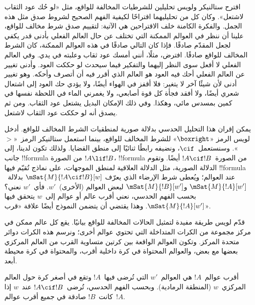 \documentclass[../../../include/open-logic-section]{subfiles}
\begin{document}


اقترح ستالنيكر ولويس تحليلين للشرطيات المخالفة للواقع، مثل «لو حُك
عود الثقاب لاشتعل». وكان كل من تحليليهما اقتراحًا لكيفية الفهم الصحيح
لشروط صدق مثل هذه الجمل. والفكرة الكامنة خلف الاقتراحين هي الآتية:
لتقييم صدق شرط مخالف للواقع، علينا أن ننظر في العوالم الممكنة التي تختلف
عن حال العالم الفعلي بأدنى قدر يكفي لجعل المقدّم صادقًا. فإذا كان التالي
صادقًا في هذه العوالم الممكنة، كان الشرط المخالف للواقع صادقًا. افترض،
مثلًا، أنني أمسك عود ثقاب وعلبته في يدي. وفي العالم الفعلي لا أفعل سوى
النظر إليهما والتفكير فيما سيحدث لو حككت العود. وأدنى تغيير عن العالم
الفعلي أحك فيه العود هو العالم الذي أقرر فيه أن أتصرف وأحكه. وهو تغيير
أدنى لأن شيئًا آخر لا يتغير: فلا أقفز في الهواء أيضًا، ولا يؤدي حك العود
إلى اشتعال شعري أيضًا، ولا أفقد فجأة كل قوة أصابعي، ولا يغمرني الماء
في اللحظة نفسها في كمين بمسدس مائي، وهكذا. وفي ذلك الإمكان البديل يشتعل
عود الثقاب. ومن ثم يصدق أنه لو حككت عود الثقاب لاشتعل.

يمكن إقران هذا التحليل الحدسي بدلالة صورية لمنطقيات الشرط المخالف
للواقع. أدخل لويس الرمز «$\boxright$» للشرط المخالف للواقع، بينما استعمل
ستالنيكر الرمز~«$>$». وسنستعمل~$\cif$، ونضيفه رابطًا ثنائيًا إلى منطق
القضايا. ولذلك تكون لدينا، إلى جانب !!{formula} من الصورة
$!A \lif !B$، !!{formula} من الصورة~$!A \cif !B$ أيضًا. وتقوم الدلالة
الصورية، مثل الدلالة العلاقية لمنطق الموجهات، على نماذج تُقيّم فيها
!!{formula} عند العوالم؛ ويُعطى شرط الإرضاء الذي يعرّف
$\mSat{M}{!A \cif !B}[w]$ بدلالة~$\mSat{M}{!A}[w']$
و$\mSat{M}{!B}[w']$ لبعض العوالم (الأخرى)~$w'$. فأي~$w'$ نعني؟
بحسب الفهم الحدسي، نعني أقرب عالم أو عوالم إلى~$w$ يتحقق فيها
$\mSat{M}{!A}[w']$. وهذا يقتضي أن يتضمن النموذج أيضًا علاقة
«قرب».

قدّم لويس طريقة مفيدة لتمثيل الحالات المخالفة للواقع بيانيًا. يقع كل
عالم ممكن في مركز مجموعة من الكرات المتداخلة التي تحتوي عوالم أخرى؛
ونرسم هذه الكرات دوائر متحدة المركز. وتكون العوالم الواقعة بين كرتين
متساوية القرب من العالم المركزي بعضها مع بعض، والعوالم المحتواة في كرة
داخلية أقرب، والمحتواة في كرة محيطة أبعد.
\begin{center}
\end{center}
أقرب عوالم~$!A$ هي العوالم~$w'$ التي تُرضى فيها~$!A$ وتقع في أصغر
كرة حول العالم المركزي~$w$ (المنطقة الرمادية). وبحسب الفهم الحدسي،
تُرضى~$!A \cif !B$ عند~$w$ إذا كانت~$!B$ صادقة في جميع أقرب
عوالم~$!A$.
\end{document}
